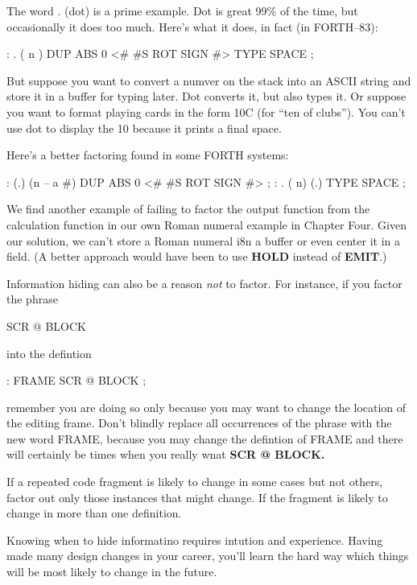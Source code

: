 The word . (dot) is a prime example. Dot is great 99\% of the time, but occasionally it does too much. Here's what it does, in fact (in FORTH--83):

\begin{Code}
: .   ( n )  DUP ABS 0 <# #S  ROT SIGN  #> TYPE SPACE ;
\end{Code}
But suppose you want to convert a numver on the stack into an ASCII string and store it in a buffer for typing later. Dot converts it, but also types it. Or suppose you want to format playing cards in the form 10C (for ``ten of clubs''). You can't use dot to display the 10 because it prints a final space.

Here's a better factoring found in some FORTH systems:

\begin{Code}
: (.)  (n -- a #)  DUP ABS 0  <# #S  ROT SIGN  #> ;
: .  ( n)  (.) TYPE SPACE ;
\end{Code}
We find another example of failing to factor the output function from the calculation function in our own Roman numeral example in Chapter Four. Given our solution, we can't store a Roman numeral i8n a buffer or even center it in a field. (A better approach would have been to use \textbf{HOLD} instead of \textbf{EMIT}.)

Information hiding can also be a reason \emph{not} to factor. For instance, if you factor the phrase

\begin{Code}
SCR @ BLOCK
\end{Code}
into the defintion

\begin{Code}
: FRAME   SCR @ BLOCK ;
\end{Code}
remember you are doing so only because you may want to change the location of the editing frame. Don't blindly replace all occurrences of the phrase with the new word FRAME, because you may change the defintion of FRAME and there will certainly be times when you really wnat \textbf{SCR @ BLOCK.}

\begin{tip}
If a repeated code fragment is likely to change in some cases but not others, factor out only those instances that might change. If the fragment is likely to change in more than one definition.
\end{tip}
Knowing when to hide informatino requires intution and experience. Having made many design changes in your career, you'll learn the hard way which things will be most likely to change in the future.

